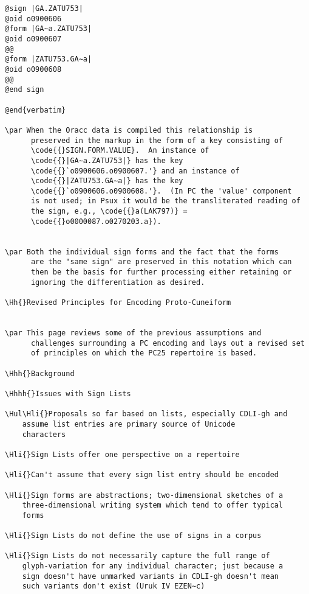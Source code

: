 \begin{verbatim}@sign |GA.ZATU753|
@oid o0900606
@form |GA∼a.ZATU753|
@oid o0900607
@@
@form |ZATU753.GA∼a|
@oid o0900608
@@
@end sign
      
@end{verbatim}

\par When the Oracc data is compiled this relationship is
      preserved in the markup in the form of a key consisting of
      \code{{}SIGN.FORM.VALUE}.  An instance of
      \code{{}|GA∼a.ZATU753|} has the key
      \code{{}`o0900606.o0900607.'} and an instance of
      \code{{}|ZATU753.GA∼a|} has the key
      \code{{}`o0900606.o0900608.'}.  (In PC the 'value' component
      is not used; in Psux it would be the transliterated reading of
      the sign, e.g., \code{{}a(LAK797)} =
      \code{{}o0000087.o0270203.a}).


\par Both the individual sign forms and the fact that the forms
      are the "same sign" are preserved in this notation which can
      then be the basis for further processing either retaining or
      ignoring the differentiation as desired.

\Hh{}Revised Principles for Encoding Proto-Cuneiform


\par This page reviews some of the previous assumptions and
      challenges surrounding a PC encoding and lays out a revised set
      of principles on which the PC25 repertoire is based.

\Hhh{}Background

\Hhhh{}Issues with Sign Lists

\Hul\Hli{}Proposals so far based on lists, especially CDLI-gh and
	assume list entries are primary source of Unicode
	characters

\Hli{}Sign Lists offer one perspective on a repertoire

\Hli{}Can't assume that every sign list entry should be encoded

\Hli{}Sign forms are abstractions; two-dimensional sketches of a
	three-dimensional writing system which tend to offer typical
	forms

\Hli{}Sign Lists do not define the use of signs in a corpus

\Hli{}Sign Lists do not necessarily capture the full range of
	glyph-variation for any individual character; just because a
	sign doesn't have unmarked variants in CDLI-gh doesn't mean
	such variants don't exist (Uruk IV EZEN∼c)


\end{verbatim}
